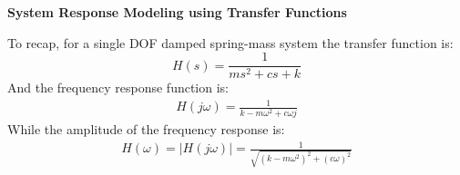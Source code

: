\documentclass[12pt,letter]{article}
\begin{document}
\begin{review}
	
	\textbf{System Response Modeling using Transfer Functions} 

	\noindent To recap, for a single DOF damped spring-mass system the transfer function is:
	\begin{equation}
	H(s) = \frac{1}{ms^2+cs+k}
	\end{equation}
	And the frequency response function is: 
	\begin{eqnarray}
	H(j\omega) = \frac{1}{k-m\omega^2+c\omega j}
	\end{eqnarray}
	While the amplitude of the frequency response is:
	\begin{eqnarray}
	H(\omega) = |H(j\omega)| = \frac{1}{\sqrt{(k-m\omega^2)^2+(c\omega)^2}}
	\end{eqnarray}
\end{review}
			\vspace{-2ex}
\end{document}
